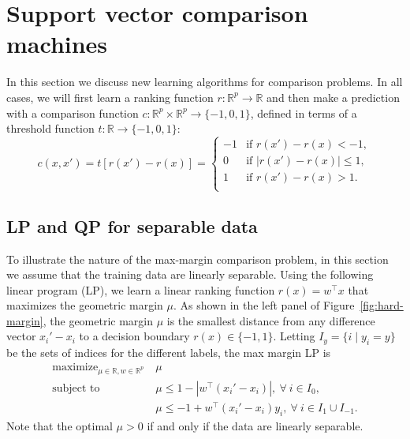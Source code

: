 \documentclass{article}
\newcommand{\RR}{\mathbb R}
\DeclareMathOperator*{\maximize}{maximize}
\begin{document}
\section{Support vector comparison machines}
\label{sec:svm-compare}

In this section we discuss new learning algorithms for comparison
problems. In all cases, we will first learn a ranking function
$r:\RR^p\rightarrow\RR$ and then make a prediction with a comparison
function $c:\RR^p\times\RR^p\rightarrow\{-1,0,1\}$, defined in terms
of a threshold function $t:\RR\rightarrow\{-1,0,1\}$:
\begin{equation}
  \label{eq:compare_threshold}
  c(x, x') =
  t\left[
    r(x')-r(x)
  \right]
  =
  \begin{cases}
    -1 & \text{if } r(x') - r(x) < -1, \\
    0 & \text{if } |r(x') - r(x)| \leq 1, \\
    1 & \text{if } r(x') - r(x) > 1. \\
  \end{cases}
\end{equation}

\subsection{LP and QP for separable data}
\label{sec:lp-qp}

To illustrate the nature of the max-margin comparison problem, in this
section we assume that the training data are linearly separable. 
Using the following linear program (LP), we learn a linear ranking
function $r(x)=w^\intercal x$ that maximizes the geometric margin
$\mu$. As shown in the left panel of Figure~\ref{fig:hard-margin}, the
geometric margin $\mu$ is the smallest distance from any difference
vector $x_i'-x_i$ to a decision boundary $r(x)\in\{-1,1\}$. Letting
$I_y=\{i\mid y_i=y\}$ be the sets of indices for the different labels,
the max margin LP is
\begin{equation}
  \label{eq:max-margin-lp}
  \begin{aligned}
    \maximize_{\mu\in\RR, w\in\RR^p}\ & \mu \\
    \text{subject to}\ & \mu \leq 1-|w^\intercal (x_i' - x_i)|,\
    \forall\  i\in I_0,\\
    &\mu \leq -1 +  w^\intercal(x_i'-x_i)y_i,\ \forall\ i\in I_1\cup I_{-1}.
  \end{aligned}
\end{equation}
Note that the optimal $\mu>0$ if and only if the data are linearly
separable.
\end{document}

